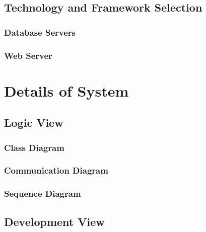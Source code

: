 \documentclass[12pt]{article}
\begin{document}
	\subsection{Technology and Framework Selection}



	\subsubsection{Database Servers}



	\subsubsection{Web Server}



\section{Details of System}

	\subsection {Logic View}
	
	

	\subsubsection{Class Diagram}



	\subsubsection{Communication Diagram}



	\subsubsection {Sequence Diagram}



	\subsection{Development View}
\end{document}
